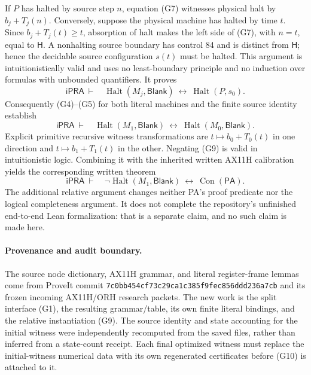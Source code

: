 If $P$ has halted by source step $n$, equation (G7) witnesses physical
halt by $b_j+T_j(n)$.  Conversely, suppose the physical machine has
halted by time $t$.  Since $b_j+T_j(t)\geq t$, absorption of halt makes
the left side of (G7), with $n=t$, equal to $\mathsf H$.  A nonhalting
source boundary has control 84 and is distinct from $\mathsf H$;
hence the decidable source configuration $s(t)$ must be halted.  This
argument is intuitionistically valid and uses no least-boundary
principle and no induction over formulas with unbounded quantifiers.
It proves
\[
 \mathsf{iPRA}\ \vdash\quad
 \operatorname{Halt}(M_j,\mathsf{Blank})
 \ \longleftrightarrow\ \operatorname{Halt}(P,s_0).              \tag{G8}
\]
Consequently (G4)--(G5) for both literal machines and the finite source
identity establish
\[
 \mathsf{iPRA}\ \vdash\quad
 \operatorname{Halt}(M_1,\mathsf{Blank})
 \ \longleftrightarrow\ \operatorname{Halt}(M_0,\mathsf{Blank}).  \tag{G9}
\]
Explicit primitive recursive witness transformations are
$t\mapsto b_0+T_0(t)$ in one direction and
$t\mapsto b_1+T_1(t)$ in the other.  Negating (G9) is valid in
intuitionistic logic.  Combining it with the inherited written AX11H
calibration yields the corresponding written theorem
\[
 \mathsf{iPRA}\ \vdash\quad
 \neg\operatorname{Halt}(M_1,\mathsf{Blank})
 \ \longleftrightarrow\ \operatorname{Con}(\mathsf{PA}).         \tag{G10}
\]
The additional relative argument changes neither PA's proof predicate
nor the logical completeness argument.  It does not complete the
repository's unfinished end-to-end Lean formalization: that is a
separate claim, and no such claim is made here.

\paragraph{Provenance and audit boundary.}
The source node dictionary, AX11H grammar, and literal register-frame
lemmas come from ProveIt commit
\texttt{7c0bb454cf73c29ca1c385f9fec856ddd236a7cb} and its frozen incoming
AX11H/ORH research packets.  The new work is the split interface (G1),
the resulting grammar/table, its own finite literal bindings, and the
relative instantiation (G9).  The source identity and state accounting
for the initial witness were independently recomputed from the saved
files, rather than inferred from a state-count receipt.  Each final
optimized witness must replace the initial-witness numerical data with
its own regenerated certificates before (G10) is attached to it.
